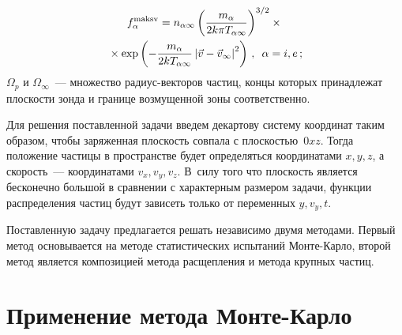 \begin{multicols}{2}
    \noindent
    \begin{multline*}
    f_\alpha^{\mathrm{maksv}}=n_{\alpha\infty}\left(\displaystyle\frac{\displaystyle m_\alpha\mathstrut}{\displaystyle 2k\pi T_{\alpha\infty}\mathstrut}\right)^{3/2}\times{}\\
    {}\times
    \exp\left( -
\displaystyle\frac{\displaystyle m_\alpha\mathstrut}{\displaystyle 2kT_{\alpha\infty}\mathstrut}\left\vert\vec{v}-\vec{v}_\infty\right\vert^2\right)\,,
\enskip \alpha=i, e\,;
\end{multline*} 
$\Omega_p$ и $\Omega_\infty$~--- множество радиус-векторов час\-тиц, концы которых принадлежат плоскости зонда и 
границе возмущенной зоны соответственно.

Для решения поставленной задачи введем декартову систему координат таким образом, чтобы 
заряженная плоскость совпала с плоскостью~$0xz$. Тогда положение частицы в пространстве будет 
определяться координатами $x,y,z$, а скорость~--- координатами $v_x, v_y, v_z$. В~силу того что 
плоскость является бесконечно большой в сравнении с характерным размером задачи, функции 
распределения частиц будут зависеть только от переменных $y, v_y, t$.

Поставленную задачу предлагается решать независимо двумя методами. Первый метод основывается на 
методе статистических испытаний Мон\-те-Кар\-ло, второй метод является композицией метода 
расщепления и метода крупных частиц.

\section{Применение метода Монте-Карло}


\end{multicols}
